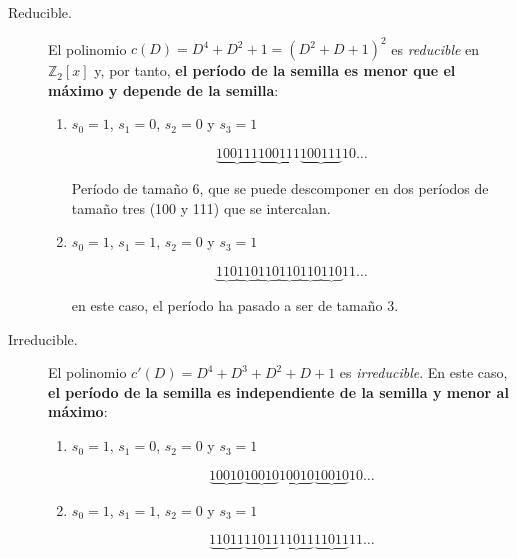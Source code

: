 \documentclass[10pt,spanish]{article}
\begin{document}
\begin{description}
    \item[Reducible.] El polinomio $c(D) = D^4 + D^2 + 1 = (D^2 + D + 1)^2$ es \textit{\textcolor{azul}{reducible}} en $\mathbb{Z}_2 [x]$ y, por tanto, \textbf{\textcolor{azul}{el período de la semilla es menor que el máximo y depende de la semilla}}:

    \begin{enumerate}[\color{azul}{$\bullet$}]
        \item $s_0 = 1$, $s_1 = 0$, $s_2 = 0$ y $s_3 = 1$

        \begin{displaymath}
            \underbrace{100111}\underbrace{100111}\underbrace{100111}10\ldots
        \end{displaymath}

        Período de tamaño 6, que se puede descomponer en dos períodos de tamaño tres (100 y 111) que se intercalan.

        \item $s_0 = 1$, $s_1 = 1$, $s_2 = 0$ y $s_3 = 1$

        \begin{displaymath}
            \underbrace{110}\underbrace{110}\underbrace{110}\underbrace{110}\underbrace{110}\underbrace{110}11\ldots
        \end{displaymath}

        en este caso, el período ha pasado a ser de tamaño 3.
    \end{enumerate}

    \item[Irreducible.] El polinomio $c'(D) = D^4 + D^3 + D^2 + D + 1$ es \textit{\textcolor{azul}{irreducible}}. En este caso, \textbf{\textcolor{azul}{el período de la semilla es independiente de la semilla y menor al máximo}}:

    \begin{enumerate}
        \item $s_0 = 1$, $s_1 = 0$, $s_2 = 0$ y $s_3 = 1$

        \begin{displaymath}
            \underbrace{10010}\underbrace{10010}\underbrace{10010}\underbrace{10010}10\ldots
        \end{displaymath}

        \item $s_0 = 1$, $s_1 = 1$, $s_2 = 0$ y $s_3 = 1$

        \begin{displaymath}
            \underbrace{11011}\underbrace{11011}\underbrace{11011}\underbrace{11011}11\ldots
        \end{displaymath}


\end{enumerate}
\end{description}
\end{document}
